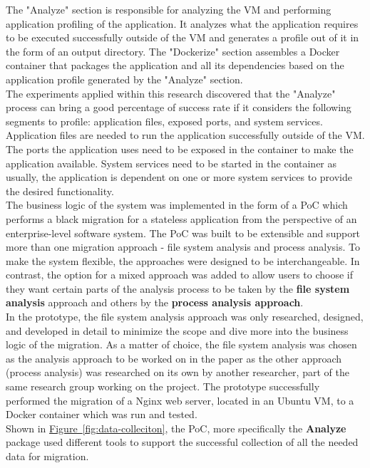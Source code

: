 \documentclass[twocolumn]{article}
\newcommand{\FigRef}[1]{\hyperref[#1]{Figure~\ref{#1}}}
\begin{document}
The "Analyze" section is responsible for analyzing the VM and performing application profiling of the application. It analyzes what the application requires to be executed successfully outside of the VM and generates a profile out of it in the form of an output directory. The "Dockerize" section assembles a Docker container that packages the application and all its dependencies based on the application profile generated by the "Analyze" section. \\

The experiments applied within this research discovered that the "Analyze" process can bring a good percentage of success rate if it considers the following segments to profile: application files, exposed ports, and system services. Application files are needed to run the application successfully outside of the VM. The ports the application uses need to be exposed in the container to make the application available. System services need to be started in the container as usually, the application is dependent on one or more system services to provide the desired functionality. \\

The business logic of the system was implemented in the form of a PoC which performs a black migration for a stateless application from the perspective of an enterprise-level software system. The PoC was built to be extensible and support more than one migration approach - file system analysis and process analysis. To make the system flexible, the approaches were designed to be interchangeable. In contrast, the option for a mixed approach was added to allow users to choose if they want certain parts of the analysis process to be taken by the \textbf{file system analysis} approach and others by the \textbf{process analysis approach}. \\

In the prototype, the file system analysis approach was only researched, designed, and developed in detail to minimize the scope and dive more into the business logic of the migration. As a matter of choice, the file system analysis was chosen as the analysis approach to be worked on in the paper as the other approach (process analysis) was researched on its own by another researcher, part of the same research group working on the project. The prototype successfully performed the migration of a Nginx web server, located in an Ubuntu VM, to a Docker container which was run and tested. \\

Shown in \FigRef{fig:data-colleciton}, the PoC, more specifically the \textbf{Analyze} package used different tools to support the successful collection of all the needed data for migration. 
\end{document}
